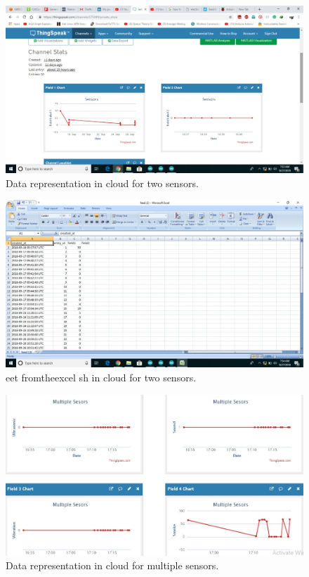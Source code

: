 \begin{figure}[h]
\centerline{\includegraphics[width=4.7in]{two}}
\caption{Data representation in cloud for two sensors.}
\end{figure}
\begin{figure}[h]
\centerline{\includegraphics[width=4.7in]{xfortwo}}
\caption{eet fromtheexcel sh in cloud for two sensors.}
\end{figure}
\begin{figure}[h]
\centerline{\includegraphics[width=4.7in]{multiplesensor}}
\caption{Data representation in cloud for multiple sensors.}
\end{figure}
\newpage

